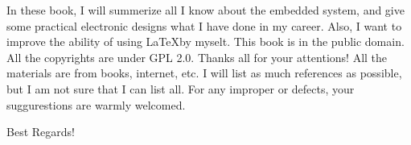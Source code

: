 \begin{frontmatter}
	In these book, I will summerize all I know about the embedded system, and give some practical electronic designs what I have done in my career. Also, I want to improve the ability of using \LaTeX by myselt. This book is in the public domain. All the copyrights are under GPL 2.0.
	Thanks all for your attentions! All the materials are from books, internet, etc. I will list as much references as possible, but I am not sure that I can list all. For any improper or defects, your suggurestions are warmly welcomed.
	
	Best Regards!
\end{frontmatter}

	
